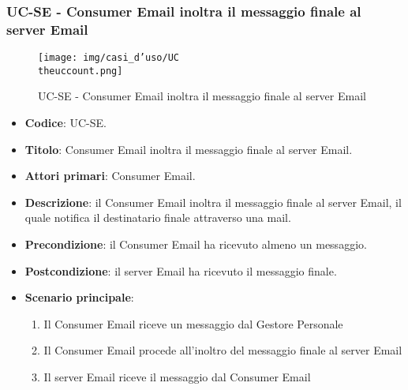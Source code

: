 \subsubsection{UC\theuccount-SE - Consumer Email inoltra il messaggio finale al server Email}
	\begin{figure}[H]
		\centering
		\texttt{[image: img/casi\_d'uso/UC\\theuccount.png]}\\
		\caption{UC\theuccount-SE - Consumer Email inoltra il messaggio finale al server Email}
	\end{figure}
	\begin{itemize}
		\item \textbf{Codice}: UC\theuccount-SE.
		\item \textbf{Titolo}: Consumer Email inoltra il messaggio finale al server Email.
		\item \textbf{Attori primari}: Consumer Email.
		\item \textbf{Descrizione}: il Consumer Email inoltra il messaggio finale al server Email, il quale notifica il destinatario finale attraverso una mail.
		\item \textbf{Precondizione}: il Consumer Email ha ricevuto almeno un messaggio.
		\item \textbf{Postcondizione}: il server Email ha ricevuto il messaggio finale.
		\item \textbf{Scenario principale}:
		\begin{enumerate}
			\item Il Consumer Email riceve un messaggio dal Gestore Personale
			\item Il Consumer Email procede all'inoltro del messaggio finale al server Email
            \item Il server Email riceve il messaggio dal Consumer Email
		\end{enumerate}

	\end{itemize}
